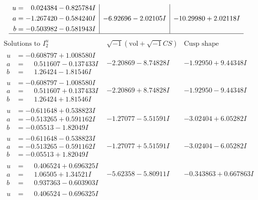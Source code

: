 \documentclass[1p]{elsarticle_modified}
\theoremstyle{definition}
\newcommand{\I}{\sqrt{-1}}
\begin{document}
$$\begin{array}{c|c|c}
\begin{aligned}
u &= \phantom{-}0.024384 - 0.825784 I \\
a &= -1.267420 - 0.584240 I \\
b &= -0.503982 - 0.581943 I\end{aligned}
 & -6.92696 - 2.02105 I & -10.29980 + 2.02118 I\\
 \hline 
 \end{array}$$\newpage$$\begin{array}{c|c|c}  
\text{Solutions to }I^u_{2}& \I (\text{vol} + \sqrt{-1}CS) & \text{Cusp shape}\\
 \hline 
\begin{aligned}
u &= -0.608797 + 1.008580 I \\
a &= \phantom{-}0.511607 - 0.137433 I \\
b &= \phantom{-}1.26424 - 1.81546 I\end{aligned}
 & -2.20869 - 8.74828 I & -1.92950 + 9.44348 I \\ \hline\begin{aligned}
u &= -0.608797 - 1.008580 I \\
a &= \phantom{-}0.511607 + 0.137433 I \\
b &= \phantom{-}1.26424 + 1.81546 I\end{aligned}
 & -2.20869 + 8.74828 I & -1.92950 - 9.44348 I \\ \hline\begin{aligned}
u &= -0.611648 + 0.538823 I \\
a &= -0.513265 + 0.591162 I \\
b &= -0.05513 - 1.82049 I\end{aligned}
 & -1.27077 - 5.51591 I & -3.02404 + 6.05282 I \\ \hline\begin{aligned}
u &= -0.611648 - 0.538823 I \\
a &= -0.513265 - 0.591162 I \\
b &= -0.05513 + 1.82049 I\end{aligned}
 & -1.27077 + 5.51591 I & -3.02404 - 6.05282 I \\ \hline\begin{aligned}
u &= \phantom{-}0.406524 + 0.696325 I \\
a &= \phantom{-}1.06505 + 1.34521 I \\
b &= \phantom{-}0.937363 - 0.603903 I\end{aligned}
 & -5.62358 - 5.80911 I & -0.343863 + 0.667863 I \\ \hline\begin{aligned}
u &= \phantom{-}0.406524 - 0.696325 I \\

\end{aligned}
\end{array}$$
\end{document}
